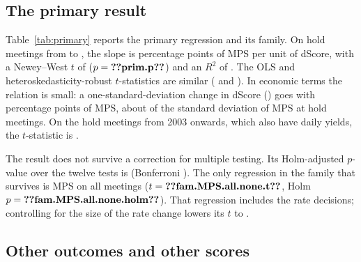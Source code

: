 \subsection{The primary result}

\begin{table}[t]
\centering
\caption{The primary specification and its family}\label{tab:primary}
\small

\end{table}

Table~\ref{tab:primary} reports the primary regression and its family. On  hold meetings from
 to , the slope is  percentage points of MPS per unit of dScore,
with a Newey--West $t$ of  ($p=\R{prim.p}$) and an $R^2$ of . The OLS and
heteroskedasticity-robust $t$-statistics are similar ( and ). In economic terms
the relation is small: a one-standard-deviation change in dScore () goes with
 percentage points of MPS, about  of the standard deviation of MPS at
hold meetings. On the  hold meetings from 2003 onwards, which also have daily yields, the
$t$-statistic is .

The result does not survive a correction for multiple testing. Its Holm-adjusted $p$-value
\citep{holm1979} over the twelve tests is  (Bonferroni
). The only regression in the family that survives is MPS on all meetings
($t=\R{fam.MPS.all.none.t}$, Holm $p=\R{fam.MPS.all.none.holm}$). That regression includes the rate
decisions; controlling for the size of the rate change lowers its $t$ to .

\subsection{Other outcomes and other scores}

